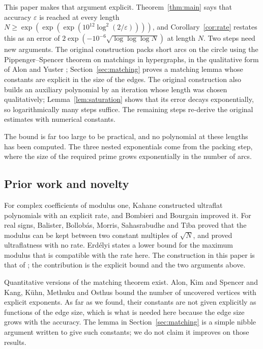 \documentclass[11pt]{article}
\theoremstyle{remark}
\begin{document}
This paper makes that argument explicit. Theorem~\ref{thm:main} says that
accuracy $\varepsilon$ is reached at every length
$N\ge\exp(\exp(\exp(10^{12}\log^2(2/\varepsilon))))$, and
Corollary~\ref{cor:rate} restates this as an error of
$2\exp(-10^{-6}\sqrt{\log\log\log N})$ at length $N$. Two steps need new
arguments. The original construction packs short arcs on the circle using
the Pippenger--Spencer theorem \cite{pippengerspencer} on matchings in
hypergraphs, in the qualitative form of Alon and Yuster \cite{alonyuster};
Section~\ref{sec:matching} proves a matching lemma whose constants are
explicit in the size of the edges. The original construction
also builds an auxiliary polynomial by an iteration whose length was chosen
qualitatively; Lemma~\ref{lem:saturation} shows that its error decays
exponentially, so logarithmically many steps suffice. The remaining steps
re-derive the original estimates with numerical constants.

The bound is far too large to be practical, and no polynomial at these
lengths has been computed. The three nested exponentials come from the
packing step, where the size of the required prime grows exponentially in
the number of arcs.

\subsection{Prior work and novelty}\label{sec:prior}

For complex coefficients of modulus one, Kahane \cite{kahane} constructed
ultraflat polynomials with an explicit rate, and Bombieri and Bourgain
\cite{bombieribourgain} improved it. For real signs, Balister, Bollob\'as,
Morris, Sahasrabudhe and Tiba \cite{bbmst} proved that the modulus can be
kept between two constant multiples of $\sqrt N$, and \cite{main} proved
ultraflatness with no rate. Erd\'elyi \cite{erdelyi} states a lower bound
for the maximum modulus that is compatible with the rate here. The
construction in this paper is that of \cite{main,predecessor}; the
contribution is the explicit bound and the two arguments above.

Quantitative versions of the matching theorem exist. Alon, Kim and Spencer
\cite{alonkimspencer} and Kang, K\"uhn, Methuku and Osthus \cite{kkmo}
bound the number of uncovered vertices with explicit exponents. As far as we
found, their constants are not given explicitly as functions of the edge
size, which is what is needed here because the edge size grows with the
accuracy. The lemma in Section~\ref{sec:matching} is a simple nibble argument
written to give such constants; we do not claim it improves on those results.
\end{document}
